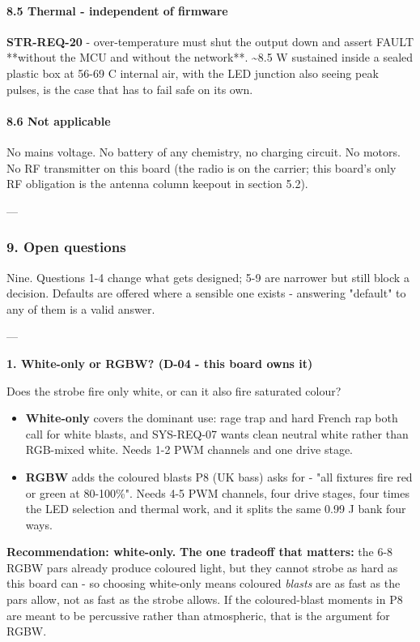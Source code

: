 \documentclass[11pt,a4paper]{article}
\begin{document}
\paragraph*{8.5 Thermal - independent of firmware}
\textbf{STR-REQ-20} - over-temperature must shut the output down and assert FAULT {*}{*}without the MCU and without the network{*}{*}. \textasciitilde{}8.5 W sustained inside a sealed plastic box at 56-69 C internal air, with the LED junction also seeing peak pulses, is the case that has to fail safe on its own.

\paragraph*{8.6 Not applicable}
No mains voltage. No battery of any chemistry, no charging circuit. No motors. No RF transmitter on this board (the radio is on the carrier; this board's only RF obligation is the antenna column keepout in section 5.2).

---

\subsubsection*{9. Open questions}
Nine. Questions 1-4 change what gets designed; 5-9 are narrower but still block a decision. Defaults are offered where a sensible one exists - answering "default" to any of them is a valid answer.

---

\textbf{1. White-only or RGBW? (D-04 - this board owns it)}

Does the strobe fire only white, or can it also fire saturated colour?

\begin{itemize}
\item \textbf{White-only} covers the dominant use: rage trap and hard French rap both call for white
blasts, and SYS-REQ-07 wants clean neutral white rather than RGB-mixed white. Needs 1-2 PWM
channels and one drive stage.
\item \textbf{RGBW} adds the coloured blasts P8 (UK bass) asks for - "all fixtures fire red or green at
80-100\%". Needs 4-5 PWM channels, four drive stages, four times the LED selection and
thermal work, and it splits the same 0.99 J bank four ways.
\end{itemize}
\textbf{Recommendation: white-only.} \textbf{The one tradeoff that matters:} the 6-8 RGBW pars already produce coloured light, but they cannot strobe as hard as this board can - so choosing white-only means coloured \emph{blasts} are as fast as the pars allow, not as fast as the strobe allows. If the coloured-blast moments in P8 are meant to be percussive rather than atmospheric, that is the argument for RGBW.
\end{document}
